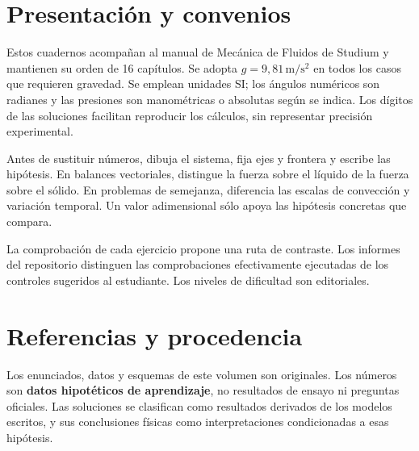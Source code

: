 \documentclass[10pt,a4paper,openany]{book}
\begin{document}
\frontmatter
\studiumreadingguide
\chapter*{Presentación y convenios}
Estos cuadernos acompañan al manual de Mecánica de Fluidos de Studium y mantienen su orden de 16 capítulos. Se adopta $g=9{,}81\,\mathrm{m/s^2}$ en todos los casos que requieren gravedad. Se emplean unidades SI; los ángulos numéricos son radianes y las presiones son manométricas o absolutas según se indica. Los dígitos de las soluciones facilitan reproducir los cálculos, sin representar precisión experimental.

Antes de sustituir números, dibuja el sistema, fija ejes y frontera y escribe las hipótesis. En balances vectoriales, distingue la fuerza sobre el líquido de la fuerza sobre el sólido. En problemas de semejanza, diferencia las escalas de convección y variación temporal. Un valor adimensional sólo apoya las hipótesis concretas que compara.

La comprobación de cada ejercicio propone una ruta de contraste. Los informes del repositorio distinguen las comprobaciones efectivamente ejecutadas de los controles sugeridos al estudiante. Los niveles de dificultad son editoriales.

\backmatter
\chapter*{Referencias y procedencia}
Los enunciados, datos y esquemas de este volumen son originales. Los números son \textbf{datos hipotéticos de aprendizaje}, no resultados de ensayo ni preguntas oficiales. Las soluciones se clasifican como resultados derivados de los modelos escritos, y sus conclusiones físicas como interpretaciones condicionadas a esas hipótesis.
\end{document}
